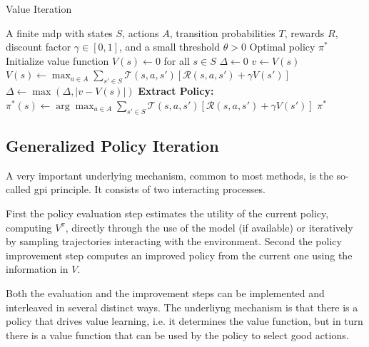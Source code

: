 \begin{algorithm}[H]
    \caption{Value Iteration}\label{alg:value_iteration}
    \begin{algorithmic}
    \Require A finite \gls{mdp} with states $S$, actions $A$, transition probabilities $T$, rewards $R$, discount factor $\gamma \in [0,1]$, and a small threshold $\theta > 0$
    \Ensure Optimal policy $\pi^*$
    \State Initialize value function $V(s) \gets 0$ for all $s \in S$
    \Repeat
        \State $\Delta \gets 0$
            \State $v \gets V(s)$
            \State $V(s) \gets \max_{a \in A} \sum_{s' \in S} \mathcal{T}(s, a,s') \left[ \mathcal{R}(s, a, s') + \gamma V(s') \right]$
            \State $\Delta \gets \max(\Delta, |v - V(s)|)$
        \EndFor
    \Until{$\Delta < \theta$}  
    \State \textbf{Extract Policy:}
        \State $\pi^*(s) \gets \arg\max_{a \in A} \sum_{s' \in S} \mathcal{T}(s,a,s') \left[ \mathcal{R}(s, a, s') + \gamma V(s') \right]$
    \EndFor
    \State \Return $\pi^*$
    \end{algorithmic}
\end{algorithm}

\subsection{Generalized Policy Iteration}
A very important underlying mechanism, common to most methods, is the so-called \gls{gpi} principle. 
It consists of two interacting processes. 

First the policy evaluation step estimates the utility
of the current policy, computing $V^{\pi}$, directly through the use of the model (if available)
or iteratively by sampling trajectories interacting with the environment.
Second the policy improvement step computes an improved policy from the current one using the information in $V$. 

Both the evaluation and the improvement steps can be implemented and interleaved in several distinct ways. 
The underliyng mechanism is that there is a policy that drives value learning, i.e. it determines the value function, but in
turn there is a value function that can be used by the policy to select good actions.


